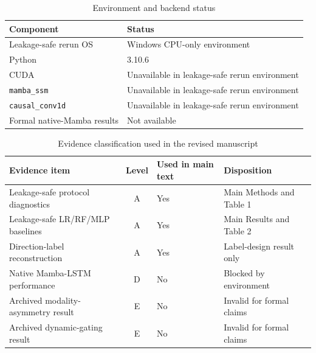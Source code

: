 \documentclass[11pt]{article}
\begin{document}
\begin{table}[H]
\centering
\caption{Environment and backend status}
\label{tab:S5_environment}
\small
\begin{tabularx}{\textwidth}{lX}
\toprule
\textbf{Component} & \textbf{Status} \\
\midrule
Leakage-safe rerun OS & Windows CPU-only environment \\
Python & 3.10.6 \\
CUDA & Unavailable in leakage-safe rerun environment \\
\texttt{mamba\_ssm} & Unavailable in leakage-safe rerun environment \\
\texttt{causal\_conv1d} & Unavailable in leakage-safe rerun environment \\
Formal native-Mamba results & Not available \\
\bottomrule
\end{tabularx}
\end{table}

\begin{table}[H]
\centering
\caption{Evidence classification used in the revised manuscript}
\label{tab:S6_evidence}
\small
\begin{tabularx}{\textwidth}{lclX}
\toprule
\textbf{Evidence item} & \textbf{Level} & \textbf{Used in main text} & \textbf{Disposition} \\
\midrule
Leakage-safe protocol diagnostics & A & Yes & Main Methods and Table 1 \\
Leakage-safe LR/RF/MLP baselines & A & Yes & Main Results and Table 2 \\
Direction-label reconstruction & A & Yes & Label-design result only \\
Native Mamba-LSTM performance & D & No & Blocked by environment \\
Archived modality-asymmetry result & E & No & Invalid for formal claims \\
Archived dynamic-gating result & E & No & Invalid for formal claims \\
\bottomrule
\end{tabularx}
\end{table}
\end{document}
